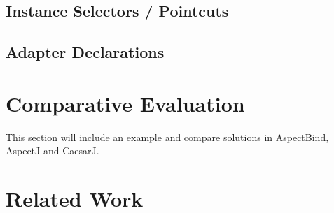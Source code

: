 \documentclass{llncs}
\begin{document}
\subsection{Instance Selectors / Pointcuts}
\subsection{Adapter Declarations}


\section{Comparative Evaluation}
This section will include an example and compare solutions in AspectBind, AspectJ and CaesarJ.



\section{Related Work}
\end{document}
